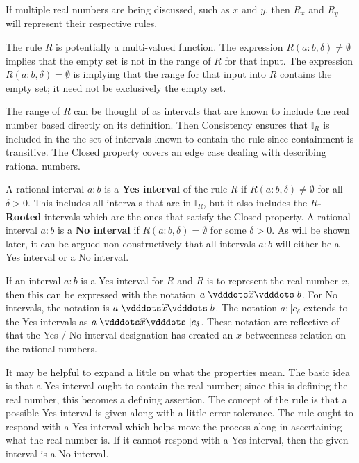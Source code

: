 \documentclass[12pt]{article}
\begin{document}
If multiple real numbers are being discussed, such as $x$ and $y$, then $R_x$ and $R_y$ will represent their respective rules. 

The rule $R$ is potentially a multi-valued function. The expression $R(a:b, \delta) \neq \emptyset$ implies that the empty set is not in the range of $R$ for that input. The expression $R(a:b, \delta) = \emptyset$ is implying that the range for that input into $R$ contains the empty set; it need not be exclusively the empty set. 

The range of $R$ can be thought of as intervals that are known to include the real number based directly on its definition. Then Consistency ensures that $\mathbb{I}_R$ is included in the the set of intervals known to contain the rule since containment is transitive. The Closed property covers an edge case dealing with describing rational numbers.

A rational interval $a:b$ is a \textbf{Yes interval} of the rule $R$ if $R(a:b, \delta) \neq \emptyset$ for all $\delta >0$. This includes all intervals that are in  $\mathbb{I}_R$, but it also includes the \textbf{$R$-Rooted} intervals which are the ones that satisfy the Closed property. A rational interval $a:b$ is a \textbf{No interval} if $R(a:b, \delta) = \emptyset$ for some $\delta > 0$. As will be shown later, it can be argued non-constructively that all intervals $a:b$ will either be a Yes interval or a No interval. 

If an interval $a:b$ is a Yes interval for $R$ and $R$ is to represent the real number $x$, then this can be expressed with the notation $a \xora b$. For No intervals, the notation is \sout{$a \xora b$}. The notation $a:|c_\delta$ extends to the Yes intervals as $a \xora |c_\delta$. These notation are reflective of that the Yes / No interval designation has created an $x$-betweenness relation on the rational numbers. 

It may be helpful to expand a little on what the properties mean. The basic idea is that a Yes interval ought to contain the real number; since this is defining the real number, this becomes a defining assertion. The concept of the rule is that a possible Yes interval is given along with a little error tolerance. The rule ought to respond with a Yes interval which helps move the process along in ascertaining what the real number is. If it cannot respond with a Yes interval, then the given interval is a No interval. 
\end{document}
